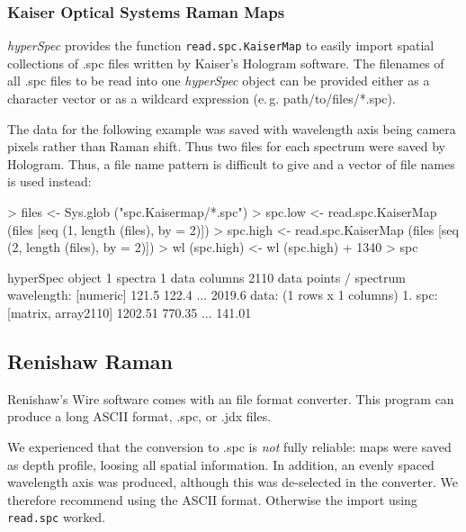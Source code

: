 \documentclass[english, a4paper, 10pt, headings=small, DIV11]{scrartcl}
\renewenvironment{Schunk}{\vspace{0pt}\begin{small}}{\end{small}\vspace{0pt}}
\newcommand{\Rfunction}[2][]{\texorpdfstring{\nohyphens{#1\texttt{#2}}}{#2}}
\newcommand{\Rclass}[1]{\texorpdfstring{\nohyphens{\textit{#1}}}{#1}}
\newcommand{\phy}{\texorpdfstring{\nohyphens{\textit{hyperSpec}}}{hyperSpec}\xspace}
\newcommand{\chy}{\Rclass{hyperSpec}\xspace}
\newcommand{\eg}{e.\,g.\xspace}
\begin{document}
\subsubsection{Kaiser Optical Systems Raman Maps}
\label{sec:read.spc.KaiserMap}

\phy provides the function \Rfunction{read.spc.KaiserMap} to easily import spatial collections of
.spc files written by Kaiser's Hologram software. The filenames of all .spc files to be read into one
\chy object can be provided either as a character vector or as a wildcard expression (\eg
\textquotedbl path/to/files/*.spc\textquotedbl ).

The data for the following example was saved with wavelength axis being camera pixels rather than
Raman shift. Thus two files for each spectrum were saved by Hologram. Thus, a file name pattern is
difficult to give and a vector of file names is used instead:
\begin{Schunk}
\begin{Sinput}
> files <- Sys.glob ("spc.Kaisermap/*.spc")
> spc.low <- read.spc.KaiserMap (files [seq (1, length (files), by = 2)])
> spc.high <- read.spc.KaiserMap (files [seq (2, length (files), by = 2)])
> wl (spc.high) <- wl (spc.high) + 1340
> spc
\end{Sinput}
\begin{Soutput}
hyperSpec object
   1 spectra
   1 data columns
   2110 data points / spectrum
wavelength:  [numeric] 121.5 122.4 ... 2019.6 
data:  (1 rows x 1 columns)
   1. spc:  [matrix, array2110] 1202.51 770.35 ... 141.01 
\end{Soutput}
\end{Schunk}

\subsection{Renishaw Raman}
\label{sec:read.txt.renishaw}

Renishaw's Wire software comes with an file format converter. This program can produce a long ASCII
format, .spc, or .jdx files.

We experienced that the conversion to .spc is \emph{not} fully reliable: maps were saved as depth
profile, loosing all spatial information. In addition, an evenly spaced wavelength axis was produced,
although this was de-selected in the converter. We therefore recommend using the ASCII format.
Otherwise the import using \Rfunction{read.spc} worked.
\end{document}
